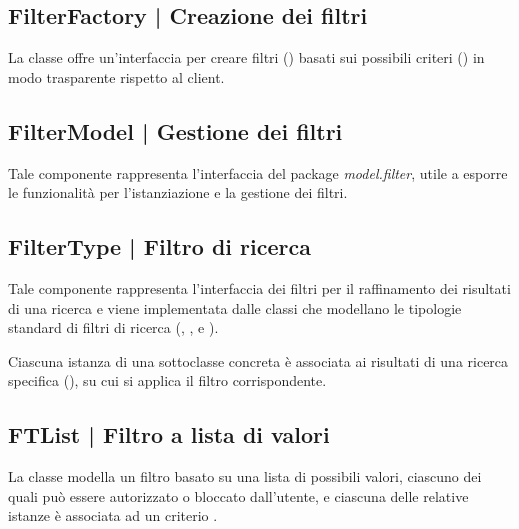 \documentclass[10pt,a4paper,headinclude,footinclude,hidelinks]{scrreprt} %
\begin{document}
	\subsection[FilterFactory]{FilterFactory | Creazione dei filtri}
	\label{sec:stage:design:sistema:model.filter:filter-factory}
	La classe \textit{} offre un'interfaccia per creare filtri (\textit{}) basati sui possibili criteri (\textit{}) in modo trasparente rispetto al client. 

	\subsection[FilterModel]{FilterModel | Gestione dei filtri}
	\label{sec:stage:design:sistema:model.filter:filter-manager}
	Tale componente rappresenta l'interfaccia del package \textit{model.filter}, utile a esporre le funzionalità per l'istanziazione e la gestione dei filtri.

	\subsection[FilterType]{FilterType | Filtro di ricerca}
	\label{sec:stage:design:sistema:model.filter:filter}
	Tale componente rappresenta l'interfaccia dei filtri per il raffinamento dei risultati di una ricerca e viene implementata dalle classi che modellano le tipologie standard di filtri di ricerca (\textit{}, \textit{}, \textit{} e \textit{}).
	
	Ciascuna istanza di una sottoclasse concreta è associata ai risultati di una ricerca specifica (\textit{}), su cui si applica il filtro corrispondente.

	\subsection[FTList]{FTList | Filtro a lista di valori}
	\label{sec:stage:design:sistema:model.filter:list-filter}
	La classe \textit{} modella un filtro basato su una lista di possibili valori, ciascuno dei quali può essere autorizzato o bloccato dall'utente, e ciascuna delle relative istanze è associata ad un criterio \textit{}.
\end{document}
